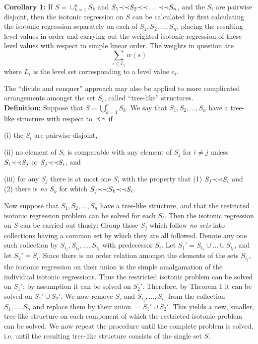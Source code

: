 {\bf Corollary 1:} If $S = \cup_{k=1}^n S_k$ and $S_1 \mbox{$\prec \prec$} S_2 \mbox{$\prec \prec$}
\ldots \mbox{$\prec \prec$} S_n$, and the $S_i$ are pairwise disjoint, then the
isotonic regression on $S$ can be calculated by first calculating the
isotonic regression separately on each of $S_1, S_2, \ldots , S_n$,
placing the resulting level values in order and carrying out the
weighted isotonic regression of these level values with respect to
simple linear order.  The weights in question are \[ \sum_{s \in L_i}
w(s) \] where $L_i$ is the level set corresponding to a level value
$c_i$.

The ``divide and conquer'' approach may also be applied to
more complicated arrangements amongst the set $S_i$, called
``tree-like'' structures.\\
{\bf Definition:} Suppose that $S = \bigcup_{k=1}^n S_k.$
We say that $S_1, S_2, \ldots, S_n$ have a tree-like
structure with respect to $\mbox{$\prec \prec$}$ if \begin{list}{}{}
\item[(i)] the $S_i$ are pairwise disjoint, \item[(ii)] no
element of $S_i$ is comparable with any element of $S_j$
for $i \neq j$ unless $S_i \mbox{$\prec \prec$} S_j$ or $S_j \mbox{$\prec \prec$} S_i$, and
\item[(iii)] for any $S_j$ there is at most one $S_i$ with
the property that (1) $S_j \mbox{$\prec \prec$} S_i$ and (2) there is {\em
no} $S_k$ for which $S_j \mbox{$\prec \prec$} S_k \mbox{$\prec \prec$} S_i$.  \end{list}

Now suppose that $S_1, S_2, \ldots, S_n$ have a tree-like
structure, and that the restricted isotonic regression
problem can be solved for each $S_i$.  Then the isotonic
regression on $S$ can be carried out thusly:  Group those
$S_j$ which follow {\em no sets} into collections having a
common set by which they are all followed.  Denote any one
such collection by $S_{i_1}, S_{i_2}, \ldots, S_{i_r}$ with
predecessor $S_i$.  Let $S_1' = S_{i_1} \cup \ldots \cup
S_{i_r}$, and let $S_2' = S_i$.  Since there is no order
relation amongst the elements of the sets $S_{i_j}$, the
isotonic regression on their union is the simple
amalgamation of the individual isotonic regressions.  Thus
the restricted isotonic problem can be solved on $S_1'$; by
assumption it can be solved on $S_2'$.  Therefore, by
Theorem 1 it can be solved on $S_1' \cup S_2'$.  We now
remove $S_i$ and $S_{i_1}, \ldots, S_{i_r}$ from the
collection $S_1, \ldots, S_n$ and replace them by their
union $=S_1' \cup S_2'$.  This yields a new, smaller,
tree-like structure on each component of which the
restricted isotonic problem can be solved.  We now repeat
the procedure until the complete problem is solved, i.e.
until the resulting tree-like structure consists of the
single set $S$.


